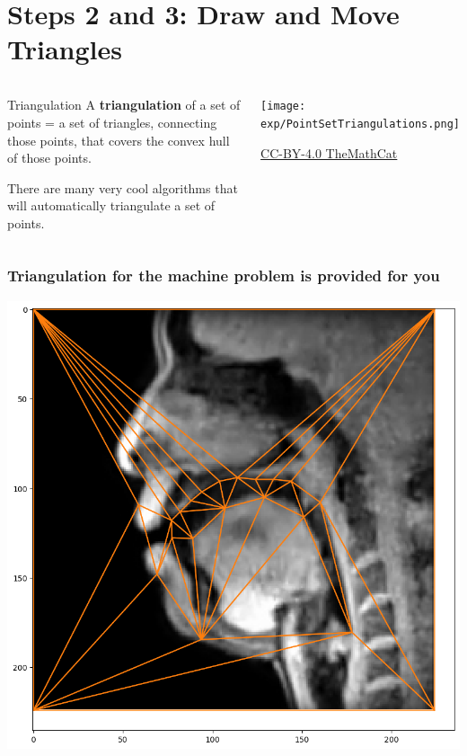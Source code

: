 \documentclass{beamer}
\begin{document}
\section[Triangulation]{Steps 2 and 3: Draw and Move Triangles}
\setcounter{subsection}{1}


\begin{frame}
  \begin{columns}[t]
    \column{2.5in}
    \begin{block}{Triangulation}
      A {\bf triangulation} of a set of points = a set of triangles,
      connecting those points, that covers the convex hull of those
      points.

      There are many very cool algorithms that will automatically
      triangulate a set of points.
    \end{block}
    \column{2.25in}
    \begin{block}{}
      \centerline{\texttt{[image: exp/PointSetTriangulations.png]}}
      \centerline{\tiny\href{https://commons.wikimedia.org/wiki/File:PointSetTriangulations.svg}{CC-BY-4.0 TheMathCat}}
    \end{block}
  \end{columns}
\end{frame}  

\begin{frame}
  \frametitle{Triangulation for the machine problem is provided for you}
  \centerline{\includegraphics[height=0.7\textheight]{triangles.png}}
\end{frame}
\end{document}
